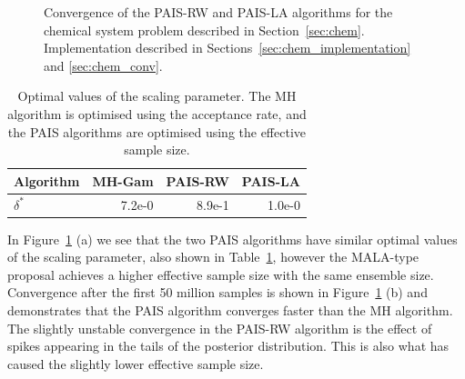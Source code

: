 \documentclass[final]{siamltex}
\begin{document}
\begin{figure}[htb]
\centering
{}
\caption{Convergence of the PAIS-RW and PAIS-LA algorithms for the chemical system problem described in Section~\ref{sec:chem}. Implementation described in Sections~\ref{sec:chem_implementation} and \ref{sec:chem_conv}.}
\label{fig:C1_ESS}
\end{figure}

\begin{table}[!htb]
      \centering
        \begin{tabular}{|l|r|r|r|}
	\hline
	Algorithm	& MH-Gam & PAIS-RW & PAIS-LA \\ \hline
	$\delta^*$	& 7.2e-0     & 8.9e-1    & 1.0e-0 \\
	\hline
	\end{tabular}
	\vspace{1mm}
	\caption{Optimal values of the scaling parameter. The MH algorithm is optimised using the acceptance rate, and the PAIS algorithms are optimised using the effective sample size.}
	\label{table:C1_opt_delta}
\end{table}

In Figure~\ref{fig:C1_ESS} (a) we see that the two PAIS algorithms have similar optimal values of the scaling parameter, also shown in Table~\ref{table:C1_opt_delta}, however the MALA-type proposal achieves a higher effective sample size with the same ensemble size. Convergence after the first 50 million samples is shown in Figure~\ref{fig:C1_ESS} (b) and demonstrates that the PAIS algorithm converges faster than the MH algorithm. The slightly unstable convergence in the PAIS-RW algorithm is the effect of spikes appearing in the tails of the posterior distribution. This is also what has caused the slightly lower effective sample size.
\end{document}
